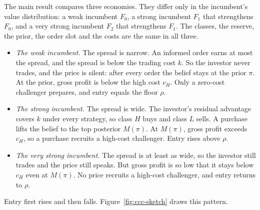 The main result compares three economies. They differ only in the incumbent's value distribution: a weak
incumbent \(F_0\), a strong incumbent \(F_1\) that strengthens \(F_0\), and a very strong incumbent \(F_2\) that
strengthens \(F_1\). The classes, the reserve, the prior, the order slot and the costs are the same in all three.
\begin{itemize}
\item \emph{The weak incumbent.} The spread is narrow. An informed order earns at most the spread, and the
  spread is below the trading cost \(k\). So the investor never trades, and the price is silent: after every
  order the belief stays at the prior \(\pi\). At the prior, gross profit is below the high cost \(c_H\). Only a
  zero-cost challenger prepares, and entry equals the floor \(\rho\).
\item \emph{The strong incumbent.} The spread is wide. The investor's residual advantage covers \(k\) under
  every strategy, so class \(H\) buys and class \(L\) sells. A purchase lifts the belief to the top posterior
  \(M(\pi)\). At \(M(\pi)\), gross profit exceeds \(c_H\), so a purchase recruits a high-cost challenger. Entry
  rises above \(\rho\).
\item \emph{The very strong incumbent.} The spread is at least as wide, so the investor still trades and the
  price still speaks. But gross profit is so low that it stays below \(c_H\) even at \(M(\pi)\). No price recruits
  a high-cost challenger, and entry returns to \(\rho\).
\end{itemize}
Entry first rises and then falls. Figure~\ref{fig:ccc-sketch} draws this pattern.

